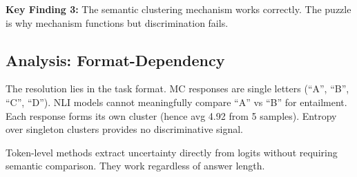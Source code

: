 \textbf{Key Finding 3:} The semantic clustering mechanism works correctly. The puzzle is why mechanism functions but discrimination fails.

\subsection{Analysis: Format-Dependency}

The resolution lies in the task format. MC responses are single letters (``A'', ``B'', ``C'', ``D''). NLI models cannot meaningfully compare ``A'' vs ``B'' for entailment. Each response forms its own cluster (hence avg 4.92 from 5 samples). Entropy over singleton clusters provides no discriminative signal.

Token-level methods extract uncertainty directly from logits without requiring semantic comparison. They work regardless of answer length.

